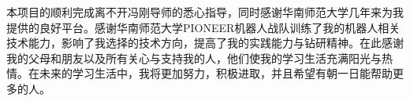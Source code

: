 
\begin{ack}
  本项目的顺利完成离不开冯刚导师的悉心指导，同时感谢华南师范大学几年来为我提供的良好平台。感谢华南师范大学PIONEER机器人战队训练了我的机器人相关技术能力，影响了我选择的技术方向，提高了我的实践能力与钻研精神。在此感谢我的父母和朋友以及所有关心与支持我的人，他们使我的学习生活充满阳光与热情。在未来的学习生活中，我将更加努力，积极进取，并且希望有朝一日能帮助更多的人。
\end{ack}

